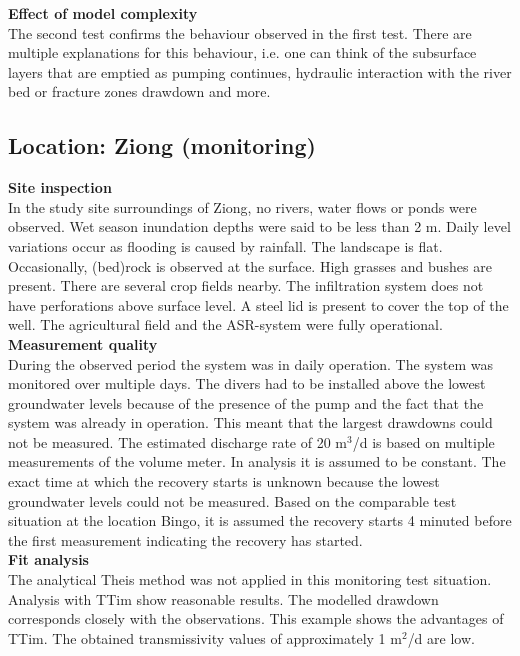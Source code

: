 \textbf{Effect of model complexity} \\
The second test confirms the behaviour observed in the first test. There are multiple explanations for this behaviour, i.e. one can think of the subsurface layers that are emptied as pumping continues, hydraulic interaction with the river bed or fracture zones drawdown and more. 

\subsection{Location: Ziong (monitoring)}

\textbf{Site inspection} \\
In the study site surroundings of Ziong, no rivers, water flows or ponds were observed. Wet season inundation depths were said to be less than 2 m. Daily level variations occur as flooding is caused by rainfall. The landscape is flat. Occasionally, (bed)rock is observed at the surface. High grasses and bushes are present. There are several crop fields nearby. The infiltration system does not have perforations above surface level. A steel lid is present to cover the top of the well. The agricultural field and the ASR-system were fully operational. \\

\textbf{Measurement quality} \\
During the observed period the system was in daily operation. The system was monitored over multiple days. The divers had to be installed above the lowest groundwater levels because of the presence of the pump and the fact that the system was already in operation. This meant that the largest drawdowns could not be measured. The estimated discharge rate of 20 m$^3$/d is based on multiple measurements of the volume meter. In analysis it is assumed to be constant. The exact time at which the recovery starts is unknown because the lowest groundwater levels could not be measured. Based on the comparable test situation at the location Bingo, it is assumed the recovery starts 4 minuted before the first measurement indicating the recovery has started. \\

\textbf{Fit analysis} \\
The analytical Theis method was not applied in this monitoring test situation. Analysis with TTim show reasonable results. The modelled drawdown corresponds closely with the observations. This example shows the advantages of TTim. The obtained transmissivity values of approximately 1 m$^2$/d are low. \\

